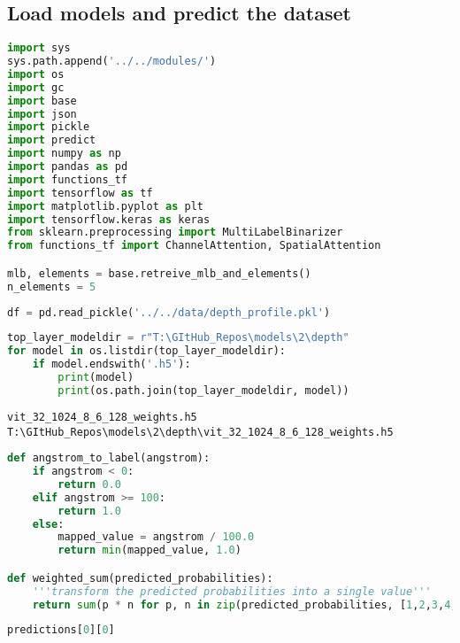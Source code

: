 \hypertarget{load-models-and-predict-the-dataset}{%
\subsection{Load models and predict the
dataset}\label{load-models-and-predict-the-dataset}}

\begin{lstlisting}[language=Python]
import sys
sys.path.append('../../modules/')
import os
import gc
import base
import json
import pickle
import predict
import numpy as np
import pandas as pd
import functions_tf
import tensorflow as tf
import matplotlib.pyplot as plt
import tensorflow.keras as keras
from sklearn.preprocessing import MultiLabelBinarizer
from functions_tf import ChannelAttention, SpatialAttention

mlb, elements = base.retreive_mlb_and_elements()
n_elements = 5
\end{lstlisting}

\begin{lstlisting}[language=Python]
df = pd.read_pickle('../../data/depth_profile.pkl')
\end{lstlisting}

\begin{lstlisting}[language=Python]
top_layer_modeldir = r"T:\GItHub_Repos\models\2\depth"
for model in os.listdir(top_layer_modeldir):
    if model.endswith('.h5'):
        print(model)
        print(os.path.join(top_layer_modeldir, model))
\end{lstlisting}

\begin{lstlisting}
vit_32_1024_8_6_128_weights.h5
T:\GItHub_Repos\models\2\depth\vit_32_1024_8_6_128_weights.h5
\end{lstlisting}

\begin{lstlisting}[language=Python]
def angstrom_to_label(angstrom):
    if angstrom < 0:
        return 0.0
    elif angstrom >= 100:
        return 1.0
    else:
        mapped_value = angstrom / 100.0
        return min(mapped_value, 1.0)

def weighted_sum(predicted_probabilities):
    '''transform the predicted probabilities into a single value'''
    return sum(p * n for p, n in zip(predicted_probabilities, [1,2,3,4,5]))
\end{lstlisting}

\begin{lstlisting}[language=Python]
predictions[0][0]
\end{lstlisting}

